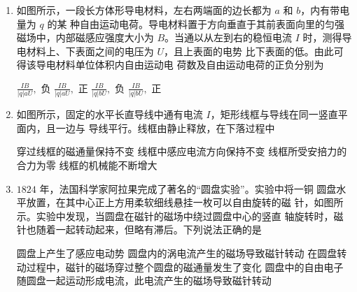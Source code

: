 

\begin{enumerate}
\item
{}
如图所示，一段长方体形导电材料，左右两端面的边长都为 $ a $ 和 $ b $，内有带电量为 $ q $ 的某
种自由运动电荷。导电材料置于方向垂直于其前表面向里的匀强磁场中，内部磁感应强度大小为
$ B $。当通以从左到右的稳恒电流 $ I $ 时，测得导电材料上、下表面之间的电压为 $ U $，且上表面的电势
比下表面的低。由此可得该导电材料单位体积内自由运动电
荷数及自由运动电荷的正负分别为  
\begin{figure}[h!]
\centering

\end{figure}
\fourchoices
{$\frac{I B}{|q| a U},$ 负}
{$\frac{I B}{|q| a U},$ 正}
{$\frac{I B}{|q| b U},$ 负}
{$\frac{I B}{|q| b U},$ 正}



\item
{}
如图所示，固定的水平长直导线中通有电流 $ I $，矩形线框与导线在同一竖直平面内，且一边与
导线平行。线框由静止释放，在下落过程中  
\begin{figure}[h!]
\centering

\end{figure}

\fourchoices
{穿过线框的磁通量保持不变}
{线框中感应电流方向保持不变}
{线框所受安掊力的合力为零}
{线框的机械能不断增大}


\item 
{}
$ 1824 $ 年，法国科学家阿拉果完成了著名的“圆盘实验”。实验中将一铜
圆盘水平放置，在其中心正上方用柔软细线悬挂一枚可以自由旋转的磁
针，如图所示。实验中发现，当圆盘在磁针的磁场中绕过圆盘中心的竖直
轴旋转时，磁针也随着一起转动起来，但略有滞后。下列说法正确的是  
\begin{figure}[h!]
\centering

\end{figure}


\fourchoices
{圆盘上产生了感应电动势}
{圆盘内的涡电流产生的磁场导致磁针转动}
{在圆盘转动过程中，磁针的磁场穿过整个圆盘的磁通量发生了变化}
{圆盘中的自由电子随圆盘一起运动形成电流，此电流产生的磁场导致磁针转动}



\end{enumerate}
